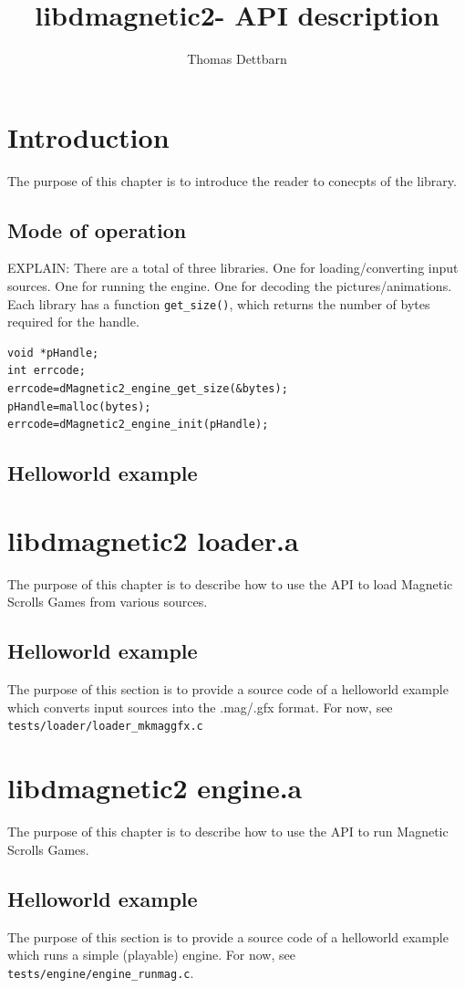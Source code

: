 \documentclass{report}
\begin{document}
\title{libdmagnetic2- API description}
\author{Thomas Dettbarn}
\maketitle
\tableofcontents
\newpage
\chapter{Introduction}
The purpose of this chapter is to introduce the reader to conecpts of the library.
\section{Mode of operation}
EXPLAIN: There are a total of three libraries. One for loading/converting input sources. One for running the engine. One for decoding the pictures/animations. 
Each library has a function \verb+get_size()+, which returns the number of bytes required for the handle. 
\begin{verbatim}
void *pHandle;
int errcode;
errcode=dMagnetic2_engine_get_size(&bytes);
pHandle=malloc(bytes);
errcode=dMagnetic2_engine_init(pHandle);
\end{verbatim}
\section{Helloworld example}
\chapter{libdmagnetic2 loader.a}
The purpose of this chapter is to describe how to use the API to load Magnetic Scrolls Games from various sources.
\section{Helloworld example}
The purpose of this section is to provide a source code of a helloworld example which converts input sources into the .mag/.gfx format.
For now, see \verb+tests/loader/loader_mkmaggfx.c+

\chapter{libdmagnetic2 engine.a}
The purpose of this chapter is to describe how to use the API to run Magnetic Scrolls Games.
\section{Helloworld example}
The purpose of this section is to provide a source code of a helloworld example which runs a simple (playable) engine.
For now, see \verb+tests/engine/engine_runmag.c+.
\end{document}
